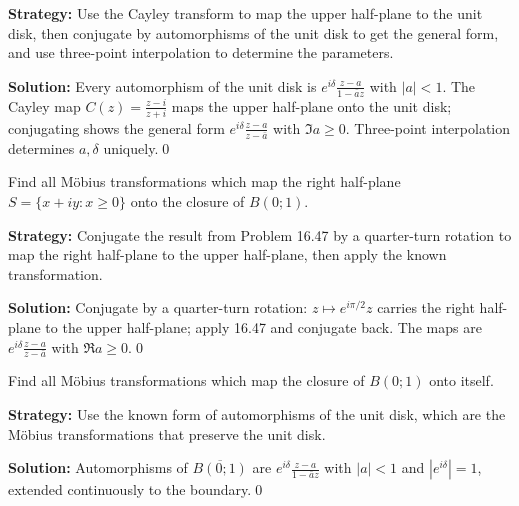 \noindent\textbf{Strategy:} Use the Cayley transform to map the upper half-plane to the unit disk, then conjugate by automorphisms of the unit disk to get the general form, and use three-point interpolation to determine the parameters.

\bigskip\noindent\textbf{Solution:}
Every automorphism of the unit disk is $e^{i\delta}\frac{z-a}{1-\bar a z}$ with $|a|<1$. The Cayley map $C(z)=\frac{z-i}{z+i}$ maps the upper half-plane onto the unit disk; conjugating shows the general form $e^{i\delta}\frac{z-a}{z-\bar a}$ with $\Im a\ge0$. Three-point interpolation determines $a,\delta$ uniquely.\qed


\begin{problembox}
\begin{problemstatement}
Find all Möbius transformations which map the right half-plane \( S = \{ x + i y : x \geq 0 \} \) onto the closure of \( B(0; 1) \).
\end{problemstatement}
\end{problembox}

\noindent\textbf{Strategy:} Conjugate the result from Problem 16.47 by a quarter-turn rotation to map the right half-plane to the upper half-plane, then apply the known transformation.

\bigskip\noindent\textbf{Solution:}
Conjugate by a quarter-turn rotation: $z\mapsto e^{i\pi/2}z$ carries the right half-plane to the upper half-plane; apply 16.47 and conjugate back. The maps are $e^{i\delta}\frac{z-a}{z-\bar a}$ with $\Re a\ge0$.\qed


\begin{problembox}
\begin{problemstatement}
Find all Möbius transformations which map the closure of \( B(0; 1) \) onto itself.
\end{problemstatement}
\end{problembox}

\noindent\textbf{Strategy:} Use the known form of automorphisms of the unit disk, which are the Möbius transformations that preserve the unit disk.

\bigskip\noindent\textbf{Solution:}
Automorphisms of $\overline{B(0;1)}$ are $e^{i\delta}\frac{z-a}{1-\bar a z}$ with $|a|<1$ and $|e^{i\delta}|=1$, extended continuously to the boundary.\qed


